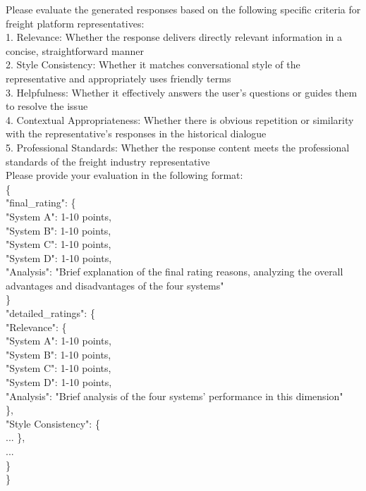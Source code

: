 \documentclass[
]{style/ceurart}
\begin{document}
\begin{tcolorbox}[colback=gray!5, colframe=gray!50]
Please evaluate the generated responses based on the following specific criteria for freight platform representatives:\\
1. Relevance: Whether the response delivers directly relevant information in a concise, straightforward manner\\
2. Style Consistency: Whether it matches conversational style of the representative and appropriately uses friendly terms\\
3. Helpfulness: Whether it effectively answers the user's questions or guides them to resolve the issue\\
4. Contextual Appropriateness: Whether there is obvious repetition or similarity with the representative's responses in the historical dialogue\\
5. Professional Standards: Whether the response content meets the professional standards of the freight industry representative\\
Please provide your evaluation in the following format:\\
\{\\
  "final\_rating": \{\\
      "System A": 1-10 points,\\
      "System B": 1-10 points,\\
      "System C": 1-10 points,\\
      "System D": 1-10 points,\\
      "Analysis": "Brief explanation of the final rating reasons, analyzing the overall advantages and disadvantages of the four systems"\\
    \}\\
  "detailed\_ratings": \{\\
    "Relevance": \{\\
      "System A": 1-10 points,\\
      "System B": 1-10 points,\\
      "System C": 1-10 points,\\
      "System D": 1-10 points,\\
      "Analysis": "Brief analysis of the four systems' performance in this dimension"\\
    \},\\
    "Style Consistency": \{\\
    ...
    \},\\
    ...\\
  \}\\
\}\\

\end{tcolorbox}
\end{document}
